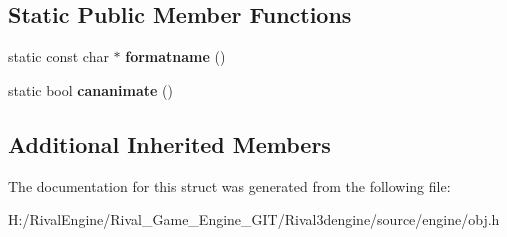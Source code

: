 \subsection*{Static Public Member Functions}
\begin{DoxyCompactItemize}
\item 
\mbox{\label{structobj_a42c01c575a21e572538ea50e5f3bf4bc}} 
static const char $\ast$ {\bfseries formatname} ()
\item 
\mbox{\label{structobj_a913a5224f09d22482b104da5636bd05e}} 
static bool {\bfseries cananimate} ()
\end{DoxyCompactItemize}
\subsection*{Additional Inherited Members}


The documentation for this struct was generated from the following file\+:\begin{DoxyCompactItemize}
\item 
H\+:/\+Rival\+Engine/\+Rival\+\_\+\+Game\+\_\+\+Engine\+\_\+\+G\+I\+T/\+Rival3dengine/source/engine/obj.\+h\end{DoxyCompactItemize}
